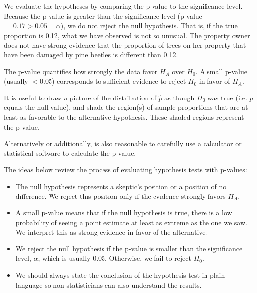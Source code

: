 We evaluate the hypotheses by comparing the p-value to the significance level. Because the p-value is greater than the significance level (p-value $= 0.17 > 0.05 =\alpha$), we do not reject the null hypothesis. That is, if the true proportion is 0.12, what we have observed is not so unusual. The property owner does not have strong evidence that the proportion of trees on her property that have been damaged by pine beetles is different than 0.12.

\begin{termBox}{
The p-value quantifies how strongly the data favor $H_A$ over $H_0$. A small p-value (usually $<0.05$) corresponds to sufficient evidence to reject $H_0$ in favor of $H_A$.}
\end{termBox}

\begin{tipBox}{
It is useful to draw a picture of the distribution of $\hat{p}$ as though $H_0$ was true (i.e. $p$ equals the null value), and shade the region(s) of sample proportions that are at least as favorable to the alternative hypothesis. These shaded regions represent the p-value.\vspace{3mm}

Alternatively or additionally, is also reasonable to carefully use a calculator or statistical software to calculate the p-value.}
\end{tipBox}

The ideas below review the process of evaluating hypothesis tests with p-values:
\begin{itemize}
\setlength{\itemsep}{0mm}
\item The null hypothesis represents a skeptic's position or a position of no difference. We reject this position only if the evidence strongly favors $H_A$.
\item A small p-value means that if the null hypothesis is true, there is a low probability of seeing a point estimate at least as extreme as the one we saw. We interpret this as strong evidence in favor of the alternative.
\item We reject the null hypothesis if the p-value is smaller than the significance level, $\alpha$, which is usually 0.05. Otherwise, we fail to reject $H_0$.
\item We should always state the conclusion of the hypothesis test in plain language so non-statisticians can also understand the results.
\end{itemize}

